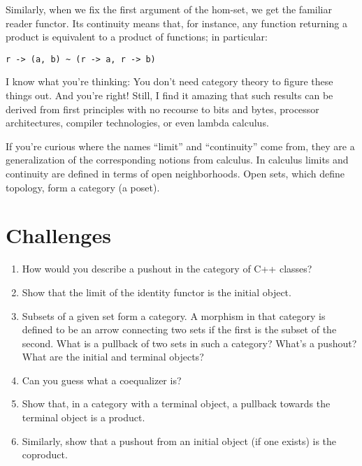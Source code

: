 Similarly, when we fix the first argument of the hom-set, we get the
familiar reader functor. Its continuity means that, for instance, any
function returning a product is equivalent to a product of functions; in
particular:

\begin{Verbatim}[commandchars=\\\{\}]
r -> (a, b) ~ (r -> a, r -> b)
\end{Verbatim}
I know what you're thinking: You don't need category theory to figure
these things out. And you're right! Still, I find it amazing that such
results can be derived from first principles with no recourse to bits
and bytes, processor architectures, compiler technologies, or even
lambda calculus.

If you're curious where the names ``limit'' and ``continuity'' come
from, they are a generalization of the corresponding notions from
calculus. In calculus limits and continuity are defined in terms of open
neighborhoods. Open sets, which define topology, form a category (a
poset).

\section{Challenges}\label{challenges}

\begin{enumerate}
\tightlist
\item
  How would you describe a pushout in the category of C++ classes?
\item
  Show that the limit of the identity functor
   is the initial object.
\item
  Subsets of a given set form a category. A morphism in that category is
  defined to be an arrow connecting two sets if the first is the subset
  of the second. What is a pullback of two sets in such a category?
  What's a pushout? What are the initial and terminal objects?
\item
  Can you guess what a coequalizer is?
\item
  Show that, in a category with a terminal object, a pullback towards
  the terminal object is a product.
\item
  Similarly, show that a pushout from an initial object (if one exists)
  is the coproduct.
\end{enumerate}